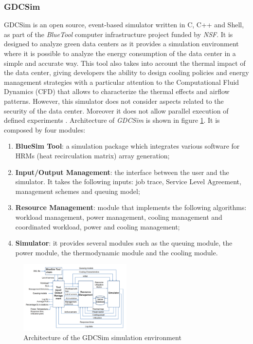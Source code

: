 {\subsubsection*{GDCSim}
GDCSim \cite{gupta2011gdcsim} is an open source, event-based simulator written in C, C++ and Shell, as part of the \emph{BlueTool} computer infrastructure project funded by \emph{NSF}. It is designed to analyze green data centers as it provides a simulation environment where it is possible to analyze the energy consumption of the data center in a simple and accurate way. This tool also takes into account the thermal impact of the data center, giving developers the ability to design cooling policies and energy management strategies with a particular attention to the Computational Fluid Dynamics (CFD) that allows to characterize the thermal effects and airflow patterns. However, this simulator does not consider aspects related to the security of the data center. Moreover it does not allow parallel execution of defined experiments \cite{mansouri2020cloud}.
Architecture of \emph{GDCSim} is shown in figure \ref{fig:gdcsim_arch}. It is composed by four modules:
\begin{enumerate}
    \item \textbf{BlueSim Tool}: a simulation package which integrates various software for HRMs (heat recirculation matrix) array generation;
    \item \textbf{Input/Output Management}: the interface between the user and the simulator. It takes the following inputs: job trace, Service Level Agreement, management schemes and queuing model;
    \item \textbf{Resource Management}: module that implements the following algorithms: workload management, power management, cooling management and coordinated workload, power and cooling management;
    \item \textbf{Simulator}: it provides several modules such as the queuing module, the power module, the thermodynamic module and the cooling module.
\end{enumerate}
\begin{figure}[h]
    \centering
    \includegraphics[width=0.5\textwidth]{chapters/images/gdcsim_arch.png}
    \caption{Architecture of the GDCSim simulation environment}
    \label{fig:gdcsim_arch}
\end{figure}

}

